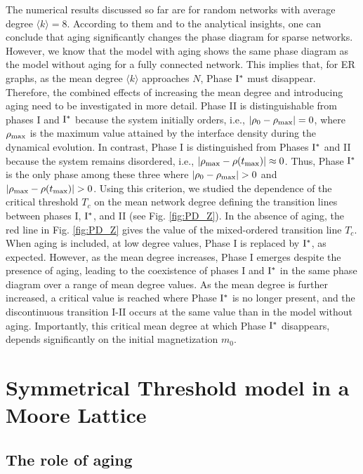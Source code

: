 The numerical results discussed so far are for random networks with average degree $\langle k \rangle = 8$. According to them and to the analytical insights, one can conclude that aging significantly changes the phase diagram for sparse networks. However, we know that the model with aging shows the same phase diagram as the model without aging for a fully connected network. This implies that, for ER graphs, as the mean degree $\langle k \rangle$ approaches $N$, Phase ${\rm I}^{*}$ must disappear. Therefore, the combined effects of increasing the mean degree and introducing aging need to be investigated in more detail. Phase II is distinguishable from phases I and ${\rm I}^{*}$ because the system initially orders, i.e., $|\rho_0 - \rho_{\rm max}| = 0$, where $\rho_{\rm max}$ is the maximum value attained by the interface density during the dynamical evolution. In contrast, Phase I is distinguished from Phases ${\rm I}^{*}$ and II because the system remains disordered, i.e., $|\rho_{\rm max} - \rho(t_{\rm max})| \approx 0$. Thus, Phase ${\rm I}^{*}$ is the only phase among these three where $|\rho_0 - \rho_{\rm max}| > 0$ and $|\rho_{\rm max} - \rho(t_{\rm max})| > 0$. Using this criterion, we studied the dependence of the critical threshold  $T_c$ on the mean network degree defining the transition lines between phases I, ${\rm I}^{*}$, and II (see Fig. \ref{fig:PD_Z}). In the absence of aging, the red line in Fig. \ref{fig:PD_Z} gives the value of the mixed-ordered transition line $T_c$. When aging is included, at low degree values, Phase I is replaced by ${\rm I}^{*}$, as expected. However, as the mean degree increases, Phase I emerges despite the presence of aging, leading to the coexistence of phases I and ${\rm I}^{*}$ in the same phase diagram over a range of mean degree values. As the mean degree is further increased, a critical value is reached where Phase ${\rm I}^{*}$ is no longer present, and the discontinuous transition I-II occurs at the same value than in the model without aging. Importantly, this critical mean degree at which Phase ${\rm I}^{*}$ disappears, depends significantly on the initial magnetization $m_0$.

\section{\label{sec: Symmetrical Threshold model in a Moore_Lattice}  Symmetrical Threshold model in a Moore Lattice}

\subsection{The role of aging}

